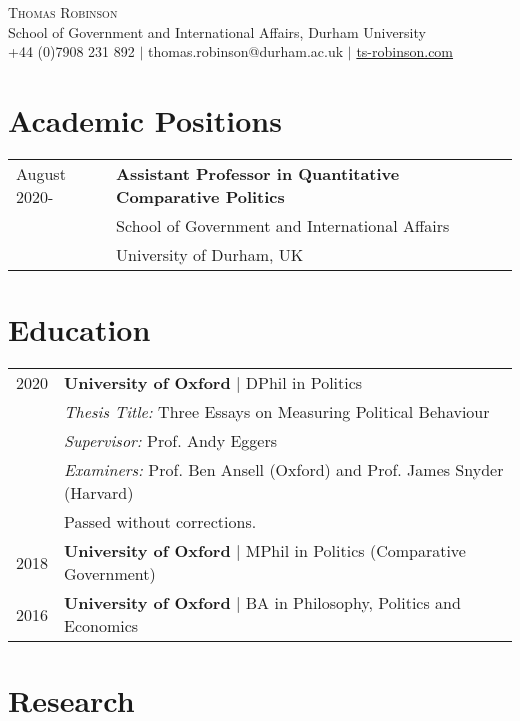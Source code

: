 \documentclass[11pt, a4paper]{article}
\begin{document}
 \begin{center}
    \textsc{\huge Thomas Robinson} \\
    School of Government and International Affairs, Durham University \\
    +44 (0)7908 231 892 $|$ thomas.robinson@durham.ac.uk $|$ \href{https://ts-robinson.com}{ts-robinson.com}
 \end{center}

\section*{Academic Positions}
\begin{tabular}{ll}
    August 2020- & \textbf{Assistant Professor in Quantitative Comparative Politics} \\
    & School of Government and International Affairs \\
    & University of Durham, UK \\

 \end{tabular}
\vspace{-1em}
 \section*{Education}
 \begin{tabular}{ll}
    2020 & \textbf{University of Oxford} $|$ DPhil in Politics \\
    	 & \textit{Thesis Title:} Three Essays on Measuring Political Behaviour \\
    	 & \textit{Supervisor:} Prof. Andy Eggers\\
    	 & \textit{Examiners:} Prof. Ben Ansell (Oxford) and Prof. James Snyder (Harvard) \\
    	 & Passed without corrections. \\
    2018  & \textbf{University of Oxford} $|$ MPhil in Politics (Comparative Government) \\
    2016 & \textbf{University of Oxford} $|$ BA in Philosophy, Politics and Economics
 \end{tabular}

 \section*{Research}

\end{document}
